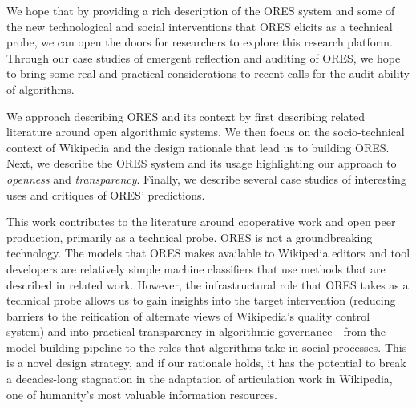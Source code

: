 We hope that by providing a rich description of the ORES system and some of the new technological and social interventions that ORES elicits as a technical probe\cite{hutchinson2003technology}, we can open the doors for researchers to explore this research platform\cite{terveen2014study}.  Through our case studies of emergent reflection and auditing of ORES, we hope to bring some real and practical considerations to recent calls for the audit-ability of algorithms\cite{sandvig2014auditing}.

We approach describing ORES and its context by first describing related literature around open algorithmic systems.  We then focus on the socio-technical context of Wikipedia and the design rationale that lead us to building ORES.  Next, we describe the ORES system and its usage highlighting our approach to \emph{openness} and \emph{transparency}.  Finally, we describe several case studies of interesting uses and critiques of ORES' predictions.

This work contributes to the literature around cooperative work and open peer production, primarily as a technical probe.  ORES is not a groundbreaking technology.  The models that ORES makes available to Wikipedia editors and tool developers are relatively simple machine classifiers that use methods that are described in related work.  However, the infrastructural role that ORES takes as a technical probe allows us to gain insights into the target intervention (reducing barriers to the reification of alternate views of Wikipedia's quality control system) and into practical transparency in algorithmic governance---from the model building pipeline to the roles that algorithms take in social processes.  This is a novel design strategy, and if our rationale holds, it has the potential to break a decades-long stagnation in the adaptation of articulation work in Wikipedia, one of humanity's most valuable information resources.
